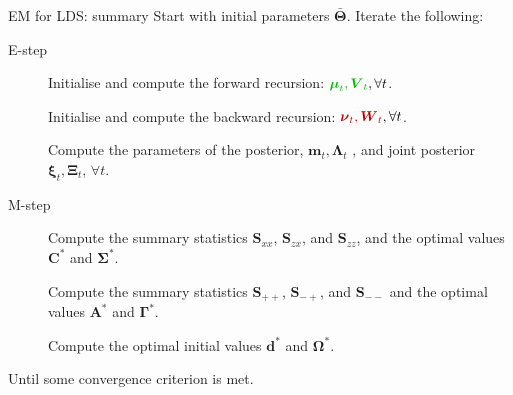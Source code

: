 \documentclass{beamer}
\newcommand{\bs}[1]{\boldsymbol{#1}}
\newcommand{\paint}[2]{{\color{#1}#2}}
\begin{document}
\begin{frame}{EM for LDS: summary}
 Start with initial parameters $\bar{\bs{\Theta}}$. Iterate the following:
 \begin{description}
  \item[E-step] Initialise and compute the forward recursion: $\paint{mygreen}{\bs{\mu}_t, \bs{V}_t}, \forall t$.
  \item[] Initialise and compute the backward recursion: $\paint{myred}{\bs{\nu}_t, \bs{W}_t}, \forall t$.
  \item[] Compute the parameters of the posterior, $\bs{m}_t,\bs{\Lambda}_t$ , and joint posterior $\bs{\xi}_t,\bs{\Xi}_t$, $\forall t$.
  \item[M-step] Compute the summary statistics $\bs{S}_{xx}$, $\bs{S}_{zx}$, and $\bs{S}_{zz}$, and the optimal values $\bs{C}^*$ and $\bs{\Sigma}^*$.
  \item[] Compute the summary statistics $\bs{S}_{++}$, $\bs{S}_{-+}$, and $\bs{S}_{--}$ and the optimal values $\bs{A}^*$ and $\bs{\Gamma}^*$.
  \item[] Compute the optimal initial values $\bs{d}^*$ and $\bs{\Omega}^*$.
 \end{description}
Until some convergence criterion is met.
\end{frame}
\end{document}
